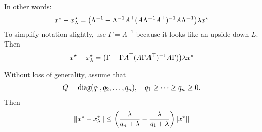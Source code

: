 \documentclass[12pt]{article}
\begin{document}
In other words:
\begin{align*}
  x^\star - x_\lambda ^\star
    = {\left(\Lambda^{-1} -
      \Lambda^{-1} A^\top (A \Lambda^{-1} A^\top)^{-1} A \Lambda^{-1}\right)}
      \lambda x^\star
\end{align*}
To simplify notation slightly, use \(\Gamma = \Lambda^{-1}\)
because it looks like an upside-down \(L\).
Then
\begin{align*}
  x^\star - x_\lambda ^\star
    = {\left(\Gamma - \Gamma A^\top (A \Gamma A^\top)^{-1} A \Gamma)\right)}
      \lambda x^\star
\end{align*}

\begin{theorem}
  Without loss of generality, assume that
  \begin{align*}
    Q = \operatorname{diag}(q_1, q_2, \ldots, q_n),
      \quad q_1 \geq \cdots \geq q_n \geq 0.
  \end{align*}
  Then
  \begin{align*}
    {\left\lVert x^\star - x_\lambda ^\star\right\rVert}
      \leq {\left(\frac{\lambda}{q_n +\lambda} -\frac{\lambda}{q_1 +\lambda}\right)}
        {\left\lVert x^\star\right\rVert}
  \end{align*}
\end{theorem}
\end{document}
